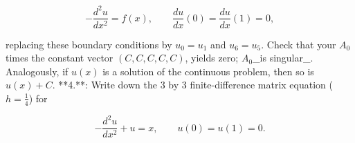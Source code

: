 \[-\frac{d^{2}u}{dx^{2}}=f(x),\qquad\frac{du}{dx}(0)=\frac{du}{dx}(1)=0,\]

replacing these boundary conditions by \(u_{0}=u_{1}\) and \(u_{6}=u_{5}\). Check that your \(A_{0}\) times the constant vector \((C,C,C,C,C)\), yields zero; \(A_{0}\)_is singular_. Analogously, if \(u(x)\) is a solution of the continuous problem, then so is \(u(x)+C\).
**4.**: Write down the \(3\) by \(3\) finite-difference matrix equation (\(h=\frac{1}{4}\)) for

\[-\frac{d^{2}u}{dx^{2}}+u=x,\qquad u(0)=u(1)=0.\] 
